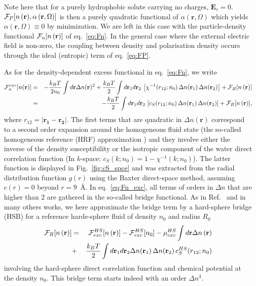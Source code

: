 \documentclass[aip,jcp,showpacs,amsmath,amssymb,superscriptaddress]{revtex4-1}
\newcommand{\bea}{\begin{eqnarray}}
\newcommand{\eea}{\end{eqnarray}}
\newcommand{\nn}{\nonumber}
\newcommand{\rr}{\mathbf{r}}
\newcommand{\rhon}{{n\left({\mathbf r}\right)}}
\newcommand{\alpharom}{{\alpha\left({\mathbf r},\Omega\right)}}
\newcommand{\F}{{\cal F}}
\newcommand{\EE}{\mathbf{E}}
\begin{document}
Note here that for a purely hydrophobic solute carrying no charges, $\EE_c = 0$. 
$\F_P[\rhon,\alpharom]$ is then a purely quadratic functional of $\alpharom$ which yields $\alpharom \equiv 0$ by minimization. 
We are left in this case  with the particle-density functional $\F_n[\rhon]$ of eq.~\ref{eq:Fn}.  In the general case where the external electric field is non-zero, the coupling between density and polarisation density occurs through the ideal (entropic) term of eq.~\ref{eq:FP}.

As for the density-dependent excess functional in eq.~\ref{eq:Fn},  we write
\bea
\F_n^{exc}[n(\rr)] &=&  -\frac{k_BT}{2n_0}  \int d\rr \Delta n(\rr)^2 + \frac{k_BT}{2}  \int d\rr_1 d\rr_2 \, \left[\chi^{-1}(r_{12};n_0) \, \Delta n(\rr_1) \,  \Delta n(\rr_2)\right]  + \F_B[\rhon] \nn \\
&=& - \frac{k_BT}{2} \int d\rr_1 d\rr_2 \, \left[c_S(r_{12};n_0) \, \Delta n(\rr_1) \,  \Delta n(\rr_2)\right]  + \F_B[\rhon],
\label{eq:Fn_exc} 
\eea
where $r_{12}=|\bm{r_1-r_2}|$.
The first terms that are quadratic in $\Delta n(\rr)$ correspond  to a second order expansion around the homogeneous fluid state (the so-called homogeneous reference (HRF) approximation \cite{ramirez02}) and they involve either the  inverse of the density susceptibility or the isotropic component of the water direct correlation function (In $k$-space: $c_S(k;n_0) = 1 - \chi^{-1}(k;n_0)$). The latter function is displayed in Fig.~\ref{fig:cS_spce} and was extracted from the radial distribution function $g(r)$  using the Baxter direct-space method, assuming $c(r)=0$ beyond $r = 9$~\AA \cite{ramirez05-CP}. 
In eq.~\ref{eq:Fn_exc}, all   terms of  orders in $\Delta n$ that are higher than 2 are gathered in the  so-called bridge functional. As in Ref.~ and  in many others works\cite{rosenfeld93,zhao-wu11,zhao-wu11-correction,liu13}, we here approximate the bridge term by a hard-sphere bridge (HSB) for a reference harde-sphere fluid of density $n_0$ and radius $R_0$
\bea
\F_B[\rhon] &= &\F_{exc}^{HS}[\rhon] -   \F_{exc}^{HS}[n_0] - \mu_{exc}^{HS} \int d\rr \Delta\rhon \nn \\
& +  & \frac{k_BT}{2} \int d\rr_1d\rr_2 \Delta n(\rr_1) \, \Delta n(\rr_2) \, c_S^{HS}(r_{12};n_0)  
\label{eq:Fn_bridge}
\eea
involving the hard-sphere direct correlation function  and chemical potential  at the density $n_0$. 
This bridge term starts indeed with an  order $\Delta n^3$.
\end{document}
